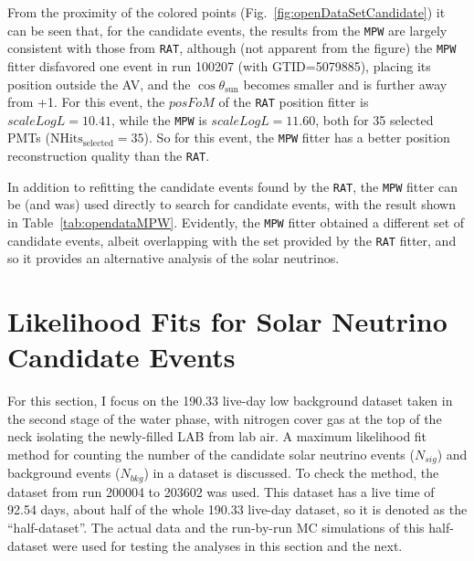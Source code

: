From the proximity of the colored points (Fig.~\ref{fig:openDataSetCandidate}) it can be seen that, for the candidate events, the results from the \texttt{MPW} are largely consistent with those from \texttt{RAT}, although (not apparent from the figure) the \texttt{MPW} fitter disfavored one event in run 100207 (with GTID=5079885), placing its position outside the AV, and the $\cos\theta_\mathrm{sun}$ becomes smaller and is further away from +1. For this event, the $posFoM$ of the \texttt{RAT} position fitter is $scaleLogL=10.41$, while the \texttt{MPW} is $scaleLogL=11.60$, both for 35 selected PMTs ($\mathrm{NHits_{selected}}=35$). So for this event, the \texttt{MPW} fitter has a better position reconstruction quality than the \texttt{RAT}.

In addition to refitting the candidate events found by the \texttt{RAT}, the \texttt{MPW} fitter can be (and was) used directly to search for candidate events, with the result shown in Table~\ref{tab:opendataMPW}. Evidently, the \texttt{MPW} fitter obtained a different set of candidate events, albeit overlapping with the set provided by the \texttt{RAT} fitter, and so it provides an alternative analysis of the solar neutrinos.

\section{Likelihood Fits for Solar Neutrino Candidate Events}\label{sect:likelihoodFitsSolarNu}

For this section, I focus on the 190.33 live-day low background dataset taken in the second stage of the water phase, with nitrogen cover gas at the top of the neck isolating the newly-filled LAB from lab air. A maximum likelihood fit method for counting the number of the candidate solar neutrino events ($N_{sig}$) and background events ($N_{bkg}$) in a dataset is discussed. To check the method, the dataset from run 200004 to 203602 was used. This dataset has a live time of 92.54 days, about half of the whole 190.33 live-day dataset, so it is denoted as the ``half-dataset''. The actual data and the run-by-run MC simulations of this half-dataset were used for testing the analyses in this section and the next.

